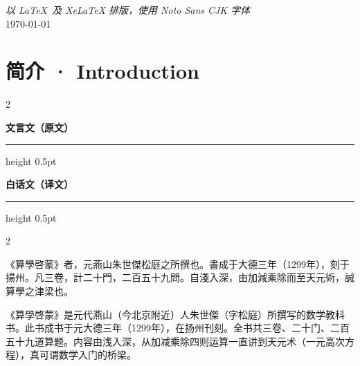 \documentclass[11pt,a4paper]{article}
\newcommand{\classicalheader}{%
  \begin{center}
  \textbf{\textcolor{headerclassical}{\large 文言文（原文）}}
  \end{center}
  \vspace{-0.3em}
  \hrule height 0.5pt \color{classicalborder}
  \vspace{0.5em}
}
\newcommand{\modernheader}{%
  \begin{center}
  \textbf{\textcolor{headermodern}{\large 白话文（译文）}}
  \end{center}
  \vspace{-0.3em}
  \hrule height 0.5pt \color{modernborder}
  \vspace{0.5em}
}
\begin{document}
\begin{titlepage}

\vfill

{\small\textit{以 \LaTeX\ 及 \textsf{XeLaTeX} 排版，使用 Noto Sans CJK 字体}\\
\today}

\end{titlepage}

\tableofcontents
\newpage

\section{简介 · Introduction}

\begin{paracol}{2}
\begin{leftcolumn}
\classicalheader
\end{leftcolumn}
\begin{rightcolumn}
\modernheader
\end{rightcolumn}
\end{paracol}

\vspace{0.3em}

\begin{paracol}{2}
\begin{leftcolumn}
《算學啓蒙》者，元燕山朱世傑松庭之所撰也。書成于大德三年（1299年），刻于揚州。凡三卷，計二十門，二百五十九問。自淺入深，由加減乘除而至天元術，誠算學之津梁也。
\end{leftcolumn}
\begin{rightcolumn}
《算學啓蒙》是元代燕山（今北京附近）人朱世傑（字松庭）所撰写的数学教科书。此书成书于元大德三年（1299年），在扬州刊刻。全书共三卷、二十门、二百五十九道算题。内容由浅入深，从加减乘除四则运算一直讲到天元术（一元高次方程），真可谓数学入门的桥梁。
\end{rightcolumn}
\end{paracol}
\end{document}
